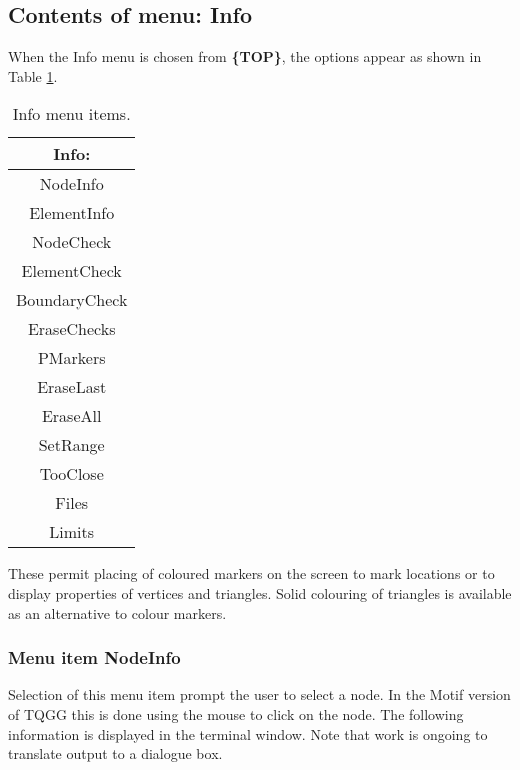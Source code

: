 \documentclass{article}
\begin{document}
\subsection{Contents of menu: Info}
When the Info menu is chosen from \textbf{\{TOP\}}, the options appear as shown in Table \ref{tab:INFO}.

\begin{table}[htb!]
 \caption{Info menu items.}
  \begin{center}
   \begin{tabular}{|c|}
    \hline
Info:\\     \hline
NodeInfo \\ ElementInfo \\     \hline
NodeCheck \\ ElementCheck \\ BoundaryCheck \\ EraseChecks \\     \hline
PMarkers \\ EraseLast \\ EraseAll \\     \hline
SetRange \\ TooClose \\     \hline
Files \\ Limits \\
    \hline
   \end{tabular}
   \label{tab:INFO}
  \end{center}
\end{table}

These permit placing of coloured markers on the screen to mark locations or to display properties of vertices and triangles. Solid colouring of triangles is available as an alternative to colour markers.


\subsubsection{Menu item NodeInfo}
Selection of this menu item prompt the user to select a node.  In the Motif version of TQGG this is done using the mouse to click on the node.  The following information is displayed in the terminal window.  Note that work is ongoing to translate output to a dialogue box.
\end{document}
